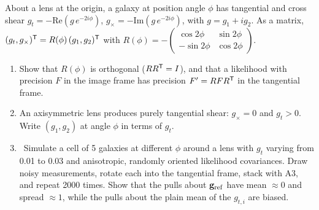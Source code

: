 

\begin{given}
About a lens at the origin, a galaxy at position angle $\phi$ has tangential and cross shear
$g_t = -\mathrm{Re}(g\,e^{-2i\phi})$, $g_\times = -\mathrm{Im}(g\,e^{-2i\phi})$, with $g = g_1 + i g_2$.
As a matrix, $(g_t, g_\times)^{\mathsf{T}} = R(\phi)\,(g_1, g_2)^{\mathsf{T}}$ with
$R(\phi) = -\begin{pmatrix}\cos2\phi & \sin2\phi\\ -\sin2\phi & \cos2\phi\end{pmatrix}$.
\end{given}


\begin{enumerate}
  \item Show that $R(\phi)$ is orthogonal ($RR^{\mathsf{T}} = I$), and that a likelihood with precision $F$ in the image frame has
    precision $F' = RFR^{\mathsf{T}}$ in the tangential frame.
  \item An axisymmetric lens produces purely tangential shear: $g_\times = 0$ and $g_t > 0$. Write $(g_1, g_2)$ at angle
    $\phi$ in terms of $g_t$.
  \item \py\ Simulate a cell of 5 galaxies at different $\phi$ around a lens with $g_t$ varying from 0.01 to 0.03 and
    anisotropic, randomly oriented likelihood covariances. Draw noisy measurements, rotate each into the tangential
    frame, stack with A3, and repeat 2000 times. Show that the pulls about $\mathbf{g}_{\rm ref}$ have mean $\approx 0$ and spread
    $\approx 1$, while the pulls about the plain mean of the $g_{t,i}$ are biased.
\end{enumerate}

